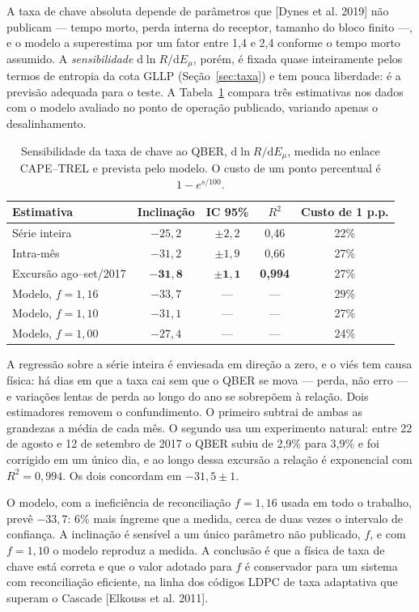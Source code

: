 \documentclass[12pt]{article}
\begin{document}
A taxa de chave absoluta depende de parâmetros que [Dynes et al. 2019] não
publicam --- tempo morto, perda interna do receptor, tamanho do bloco finito ---,
e o modelo a superestima por um fator entre 1,4 e 2,4 conforme o tempo morto
assumido. A \emph{sensibilidade} $\mathrm{d}\ln R/\mathrm{d}E_\mu$, porém, é fixada
quase inteiramente pelos termos de entropia da cota GLLP
(Seção~\ref{sec:taxa}) e tem pouca liberdade: é a previsão adequada para o teste. A
Tabela~\ref{tab:campo_taxa} compara três estimativas nos dados com o modelo
avaliado no ponto de operação publicado, variando apenas o desalinhamento.

\begin{table}[htbp]
\centering
\caption{Sensibilidade da taxa de chave ao QBER, $\mathrm{d}\ln R/\mathrm{d}E_\mu$,
medida no enlace CAPE--TREL e prevista pelo modelo. O custo de um ponto
percentual é $1 - e^{s/100}$.}
\label{tab:campo_taxa}
\footnotesize
\begin{tabular}{@{}lcccc@{}}
\toprule
\textbf{Estimativa} & \textbf{Inclinação} & \textbf{IC 95\%} & \textbf{$R^2$} & \textbf{Custo de 1 p.p.} \\
\midrule
Série inteira & $-25{,}2$ & $\pm 2{,}2$ & 0,46 & 22\% \\
Intra-mês & $-31{,}2$ & $\pm 1{,}9$ & 0,66 & 27\% \\
Excursão ago--set/2017 & $\mathbf{-31{,}8}$ & $\pm \mathbf{1{,}1}$ & \textbf{0,994} & 27\% \\
\midrule
Modelo, $f = 1{,}16$ & $-33{,}7$ & --- & --- & 29\% \\
Modelo, $f = 1{,}10$ & $-31{,}1$ & --- & --- & 27\% \\
Modelo, $f = 1{,}00$ & $-27{,}4$ & --- & --- & 24\% \\
\bottomrule
\end{tabular}
\end{table}

A regressão sobre a série inteira é enviesada em direção a zero, e o viés tem
causa física: há dias em que a taxa cai sem que o QBER se mova --- perda, não
erro --- e variações lentas de perda ao longo do ano se sobrepõem à relação. Dois
estimadores removem o confundimento. O primeiro subtrai de ambas as grandezas a
média de cada mês. O segundo usa um experimento natural: entre 22 de agosto e 12
de setembro de 2017 o QBER subiu de 2,9\% para 3,9\% e foi corrigido em um único
dia, e ao longo dessa excursão a relação é exponencial com $R^2 = 0{,}994$. Os
dois concordam em $-31{,}5 \pm 1$.

O modelo, com a ineficiência de reconciliação $f = 1{,}16$ usada em todo o
trabalho, prevê $-33{,}7$: 6\% mais íngreme que a medida, cerca de duas vezes o
intervalo de confiança. A inclinação é sensível a um único parâmetro não
publicado, $f$, e com $f = 1{,}10$ o modelo reproduz a medida. A conclusão é que a
física de taxa de chave está correta e que o valor adotado para $f$ é
conservador para um sistema com reconciliação eficiente, na linha dos códigos
LDPC de taxa adaptativa que superam o Cascade [Elkouss et al. 2011].
\end{document}
